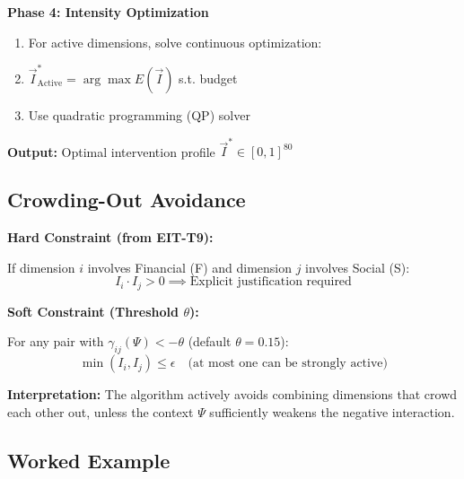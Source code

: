 \begin{tcolorbox}[colback=green!5!white, colframe=green!75!black,
    title=\textbf{Algorithm EIT-EMP-2-A1: EMERGE (Emergent Intervention Selection)}]
\textbf{Phase 4: Intensity Optimization}
\begin{enumerate}[nosep]
    \item For active dimensions, solve continuous optimization:
    \item $\vec{I}^*_{\text{Active}} = \arg\max E(\vec{I})$ s.t. budget
    \item Use quadratic programming (QP) solver
\end{enumerate}

\textbf{Output:} Optimal intervention profile $\vec{I}^* \in [0,1]^{80}$

\end{tcolorbox}

\subsection{Crowding-Out Avoidance}
\label{subsec:emp2-crowding}

\begin{tcolorbox}[colback=red!5!white, colframe=red!75!black,
    title=\textbf{Constraint EIT-EMP-2-C1: Crowding-Out Avoidance Rule}]

\textbf{Hard Constraint (from EIT-T9):}

If dimension $i$ involves Financial (F) and dimension $j$ involves Social (S):
\begin{equation}
I_i \cdot I_j > 0 \implies \text{Explicit justification required}
\end{equation}

\textbf{Soft Constraint (Threshold $\theta$):}

For any pair with $\gamma_{ij}(\Psi) < -\theta$ (default $\theta = 0.15$):
\begin{equation}
\min(I_i, I_j) \leq \epsilon \quad \text{(at most one can be strongly active)}
\end{equation}

\textbf{Interpretation:} The algorithm actively avoids combining dimensions that crowd each other out, unless the context $\Psi$ sufficiently weakens the negative interaction.

\end{tcolorbox}

\subsection{Worked Example}
\label{subsec:emp2-example}

